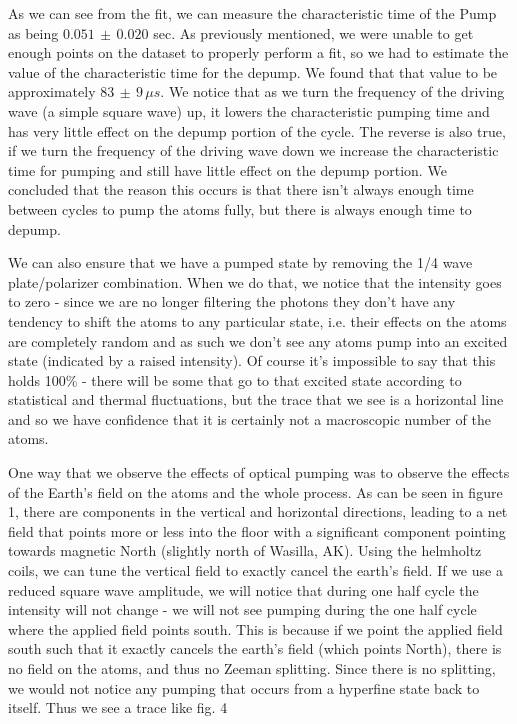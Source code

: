 \documentclass{article}
\begin{document}
    As we can see from the fit, we can measure the characteristic time of the Pump as being $0.051 \, \pm \, 0.020$ sec.  As previously mentioned, we were unable to get enough points on the dataset to properly perform a fit, so we had to estimate the value of the characteristic time for the depump.  We found that that value to be approximately $83 \, \pm \, 9 \, \mu s$.  We notice that as we turn the frequency of the driving wave (a simple square wave) up, it lowers the characteristic pumping time and has very little effect on the depump portion of the cycle.  The reverse is also true, if we turn the frequency of the driving wave down we increase the characteristic time for pumping and still have little effect on the depump portion.  We concluded that the reason this occurs is that there isn't always enough time between cycles to pump the atoms fully, but there is always enough time to depump.

    \hspace{.25cm}

    We can also ensure that we have a pumped state by removing the 1/4 wave plate/polarizer combination.  When we do that, we notice that the intensity goes to zero - since we are no longer filtering the photons they don't have any tendency to shift the atoms to any particular state, i.e. their effects on the atoms are completely random and as such we don't see any atoms pump into an excited state (indicated by a raised intensity).  Of course it's impossible to say that this holds 100\% - there will be some that go to that excited state according to statistical and thermal fluctuations, but the trace that we see is a horizontal line and so we have confidence that it is certainly not a macroscopic number of the atoms.

    \hspace{.25cm}

    One way that we observe the effects of optical pumping was to observe the effects of the Earth's field on the atoms and the whole process.  As can be seen in figure 1, there are components in the vertical and horizontal directions, leading to a net field that points more or less into the floor with a significant component pointing towards magnetic North (slightly north of Wasilla, AK).  Using the helmholtz coils, we can tune the vertical field to exactly cancel the earth's field.  If we use a reduced square wave amplitude, we will notice that during one half cycle the intensity will not change - we will not see pumping during the one half cycle where the applied field points south.  This is because if we point the applied field south such that it exactly cancels the earth's field (which points North), there is no field on the atoms, and thus no Zeeman splitting.  Since there is no splitting, we would not notice any pumping that occurs from a hyperfine state back to itself.  Thus we see a trace like fig. 4
\end{document}

